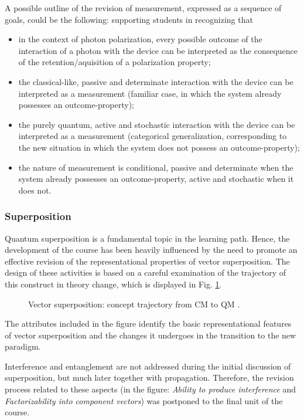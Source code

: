 \documentclass[twocolumn,secnumarabic,amssymb, nobibnotes, aps, prd, nofootinbib]{revtex4-2}
\begin{document}
A possible outline of the revision of measurement, expressed as a sequence of goals, could be the following: supporting students in recognizing that
\begin{itemize}
    \item in the context of photon polarization, every possible outcome of the interaction of a photon with the device can be interpreted as the consequence of the retention/aquisition of a polarization property;
    \item the classical-like, passive and determinate interaction with the device can be interpreted as a measurement (familiar case, in which the system already possesses an outcome-property);
    \item the purely quantum, active and stochastic interaction with the device can be interpreted as a measurement (categorical generalization, corresponding to the new situation in which the system does not possess an outcome-property);
    \item the nature of measurement is conditional, passive and determinate when the system already possesses an outcome-property, active and stochastic when it does not.
\end{itemize}

\subsubsection{Superposition} \label{Sec:3.2.2}
Quantum superposition is a fundamental topic in the learning path. Hence, the development of the course has been heavily influenced by the need to promote an effective revision of the representational properties of vector superposition. The design of these activities is based on a careful examination of the trajectory of this construct in theory change, which is displayed in Fig. \ref{FIG:17}.
\begin{figure}[!htpb]
    \caption{Vector superposition: concept trajectory from CM to QM \cite{Zuccarini2022}.}
    \label{FIG:17}
\end{figure}
The attributes included in the figure identify the basic representational features of vector superposition and the changes it undergoes in the transition to the new paradigm.

Interference and entanglement are not addressed during the initial discussion of superposition, but much later together with propagation. Therefore, the revision process related to these aspects (in the figure: \textit{Ability to produce interference} and \textit{Factorizability into component vectors}) was postponed to the final unit of the course.
\end{document}
